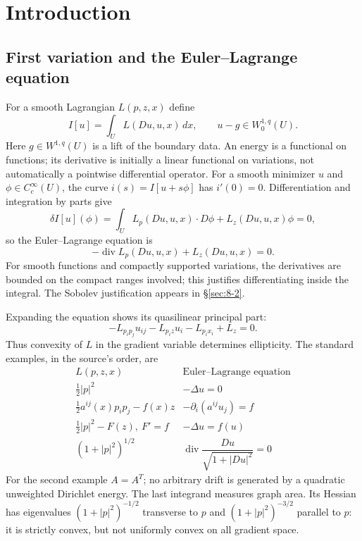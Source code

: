 \section{Introduction}
\label{sec:8-1}
\Needspace{45mm}
\subsection{First variation and the Euler--Lagrange equation}
For a smooth Lagrangian $L(p,z,x)$ define
\begin{equation}\label{eq:8-energy}
 I[u]=\int_U L(Du,u,x)\,dx,\qquad u-g\in W^{1,q}_0(U).
\end{equation}
Here $g\in W^{1,q}(U)$ is a lift of the boundary data. An energy is a
functional on functions; its derivative is initially a linear functional
on variations, not automatically a pointwise differential operator.
For a smooth minimizer $u$ and $\phi\in C_c^\infty(U)$, the curve
$i(s)=I[u+s\phi]$ has $i'(0)=0$. Differentiation and integration by parts give
\begin{equation}\label{eq:8-first-variation}
 \delta I[u](\phi)=\int_U L_p(Du,u,x)\cdot D\phi+L_z(Du,u,x)\phi=0,
\end{equation}
so the Euler--Lagrange equation is
\begin{equation}\label{eq:8-EL}
 -\operatorname{div}L_p(Du,u,x)+L_z(Du,u,x)=0.
\end{equation}
For smooth functions and compactly supported variations, the derivatives
are bounded on the compact ranges involved; this justifies differentiating
inside the integral. The Sobolev justification appears in \S\ref{sec:8-2}.

\Needspace{55mm}
Expanding the equation shows its quasilinear principal part:
\[
 -L_{p_ip_j}u_{ij}-L_{p_i z}u_i-L_{p_i x_i}+L_z=0.
\]
Thus convexity of $L$ in the gradient variable determines ellipticity.
The standard examples, in the source's order, are
\[
 \begin{array}{c|c}
 L(p,z,x)&\text{Euler--Lagrange equation}\\\hline
 \tfrac12|p|^2&-\Delta u=0\\
 \tfrac12a^{ij}(x)p_i p_j-f(x)z&-\partial_i(a^{ij}u_j)=f\\
 \tfrac12|p|^2-F(z),\ F'=f&-\Delta u=f(u)\\
 (1+|p|^2)^{1/2}&\operatorname{div}\dfrac{Du}{\sqrt{1+|Du|^2}}=0
 \end{array}
\]
For the second example $A=A^T$; no arbitrary drift is generated by a
quadratic unweighted Dirichlet energy. The last integrand measures graph
area. Its Hessian has eigenvalues $(1+|p|^2)^{-1/2}$ transverse to $p$
and $(1+|p|^2)^{-3/2}$ parallel to $p$: it is strictly convex, but not
uniformly convex on all gradient space.
\Needspace{55mm}

